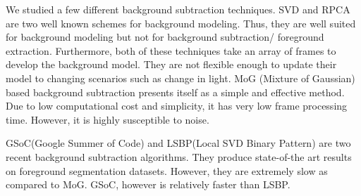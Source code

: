 We studied a few different background subtraction techniques. SVD\cite{chetverikov2010approximation} and RPCA\cite{candes2011robust} are two well known schemes for background modeling. Thus, they are well suited for background modeling but not for background subtraction/ foreground extraction. Furthermore, both of these techniques take an array of frames to develop the background model. They are not flexible enough to update their model to changing scenarios such as change in light. MoG (Mixture of Gaussian)\cite{zivkovic2006efficient} based background subtraction presents itself as a simple and effective method. Due to low computational cost and simplicity, it has very low frame processing time. However, it is highly susceptible to noise.

GSoC(Google Summer of Code) and LSBP(Local SVD Binary Pattern) are two recent background subtraction algorithms. They produce state-of-the art results on foreground segmentation datasets. However, they are extremely slow as compared to MoG. GSoC, however is relatively faster than LSBP.  





\newpage
